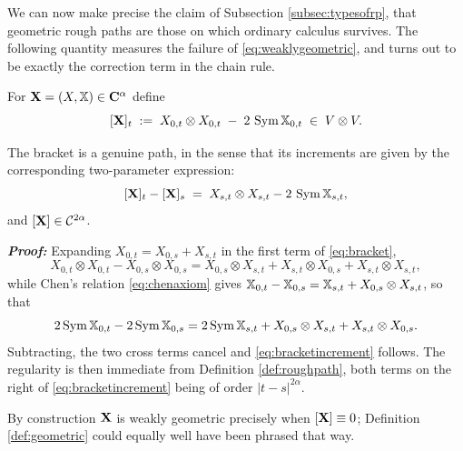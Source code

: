 We can now make precise the claim of Subsection \ref{subsec:typesofrp}, that geometric rough paths
are those on which ordinary calculus survives. The following quantity measures the failure of
\eqref{eq:weaklygeometric}, and turns out to be exactly the correction term in the chain rule.


\begin{definition}\label{def:bracket}
For $\mathbf{X} = (X,\mathbb{X}) \in \mathbf{C}^{\alpha}$ define
\begin{equation}\label{eq:bracket}
[\mathbf{X}]_t \;:=\; X_{0,t}\otimes X_{0,t} \;-\; 2\,\operatorname{Sym}\mathbb{X}_{0,t} \;\in\; V\otimes V .
\end{equation}
\end{definition}

\begin{lemma}\label{lem:bracketincrement}
The bracket is a genuine path, in the sense that its increments are given by the corresponding
two-parameter expression:
\begin{equation}\label{eq:bracketincrement}
[\mathbf{X}]_t - [\mathbf{X}]_s \;=\; X_{s,t}\otimes X_{s,t} - 2\,\operatorname{Sym}\mathbb{X}_{s,t} ,
\end{equation}
and $[\mathbf{X}] \in \mathcal{C}^{2\alpha}$.
\end{lemma}

\textbf{\textit{Proof:}} Expanding $X_{0,t} = X_{0,s}+X_{s,t}$ in the first term of
\eqref{eq:bracket},
\[
X_{0,t}\otimes X_{0,t} - X_{0,s}\otimes X_{0,s}
= X_{0,s}\otimes X_{s,t} + X_{s,t}\otimes X_{0,s} + X_{s,t}\otimes X_{s,t},
\]
while Chen's relation \eqref{eq:chenaxiom} gives
$\mathbb{X}_{0,t}-\mathbb{X}_{0,s} = \mathbb{X}_{s,t} + X_{0,s}\otimes X_{s,t}$, so that
\[
2\operatorname{Sym}\mathbb{X}_{0,t} - 2\operatorname{Sym}\mathbb{X}_{0,s} = 2\operatorname{Sym}\mathbb{X}_{s,t} + X_{0,s}\otimes X_{s,t} + X_{s,t}\otimes X_{0,s}.
\]
Subtracting, the two cross terms cancel and \eqref{eq:bracketincrement} follows. The regularity is
then immediate from Definition \ref{def:roughpath}, both terms on the right of
\eqref{eq:bracketincrement} being of order $|t-s|^{2\alpha}$. \qedfilledtext

\medskip

By construction $\mathbf{X}$ is weakly geometric precisely when $[\mathbf{X}] \equiv 0$; Definition
\ref{def:geometric} could equally well have been phrased that way.

